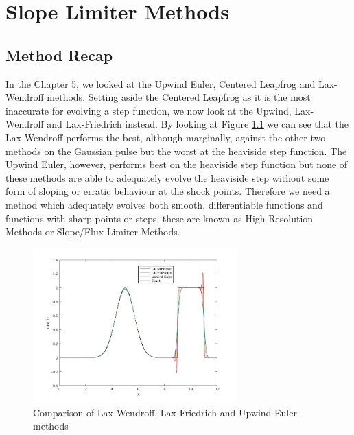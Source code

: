 \chapter{Slope Limiter Methods}
\section{Method Recap}
In the Chapter 5, we looked at the Upwind Euler, Centered Leapfrog and Lax-Wendroff methods. Setting aside the Centered Leapfrog as it is the most inaccurate for evolving a step function, we now look at the Upwind, Lax-Wendroff and Lax-Friedrich instead. By looking at Figure \ref{fig:lw_lf_ue} we can see that the Lax-Wendroff performs the best, although marginally, against the other two methods on the Gaussian pulse but the worst at the heaviside step function. The Upwind Euler, however, performs best on the heaviside step function but none of these methods are able to adequately evolve the heaviside step without some form of sloping or erratic behaviour at the shock points. Therefore we need a method which adequately evolves both smooth, differentiable functions and functions with sharp points or steps, these are known as High-Resolution Methods or Slope/Flux Limiter Methods.
\begin{figure}[H]
  \centering
  \includegraphics[width=0.7\textwidth]{Images/7_lw_lf_ue.jpg}
  \caption{Comparison of Lax-Wendroff, Lax-Friedrich and Upwind Euler methods}\label{fig:lw_lf_ue}
\end{figure}

